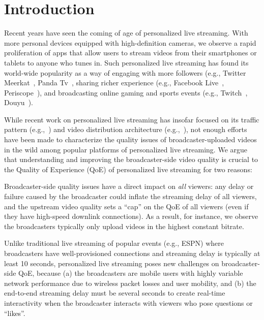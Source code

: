 \section{Introduction}
Recent years have seen the coming of age of personalized live
streaming. With more personal devices equipped with high-definition
cameras, we observe a rapid proliferation of apps that allow users
to stream videos from their smartphones or tablets to anyone who
tunes in. Such personalized live streaming has found its world-wide
popularity as a way of engaging with more followers (e.g., Twitter Meerkat~\cite{twitter}, Panda Tv~\cite{panda},
sharing richer experience (e.g., Facebook Live~\cite{facebook}, Periscope~\cite{periscope}),
and broadcasting online gaming and sports events (e.g., Twitch~\cite{twitch}, Douyu~\cite{douyu}).


While recent work on personalized live streaming has insofar 
focused on its traffic pattern (e.g.,~\cite{zhang2015crowdsourced,tang2016meerkat})
and video distribution architecture (e.g.,~\cite{siekkinen2016first,wang2016anatomy}),
not enough efforts have been made to characterize the
quality issues of broadcaster-uploaded videos in the wild among popular platforms of
personalized live streaming.
We argue that understanding and improving the broadcaster-side
video quality is crucial to the Quality of Experience (QoE) of personalized live streaming for two reasons:
\begin{packedenumerate}
\item Broadcaster-side quality issues
have a direct impact on {\em all} viewers:
any delay or failure caused by the broadcaster could inflate the
streaming delay of all viewers, and the upstream video quality
sets a ``cap'' on the QoE of all
viewers (even if they have high-speed downlink connections).
As a result, for instance, we observe
the broadcasters typically only upload videos in the highest constant
bitrate.
\item Unlike traditional live streaming of popular events
(e.g., ESPN) where broadcasters have well-provisioned
connections and streaming delay is typically at least 10 seconds,
personalized live streaming poses new challenges on
broadcaster-side QoE, because
(a) the broadcasters are mobile users with highly variable
network performance due to wireless packet losses and
user mobility, and
(b) the end-to-end streaming delay must be
several seconds to create real-time interactivity when
the broadcaster interacts with viewers who pose questions
or ``likes''.
\end{packedenumerate}

